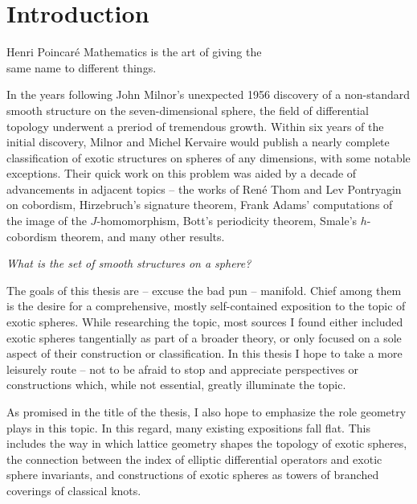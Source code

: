 \chapter{Introduction}\label{chap:introduction}

\begin{epigraph}{16em}{Henri Poincar\'e}
Mathematics is the art of giving the \\
same name to different things.
\end{epigraph}

In the years following John Milnor's unexpected 1956 discovery of a non-standard smooth structure on the seven-dimensional sphere, the field of differential topology underwent a preriod of tremendous growth. Within six years of the initial discovery, Milnor and Michel Kervaire would publish a nearly complete classification of exotic structures on spheres of any dimensions, with some notable exceptions. 
Their quick work on this problem was aided by a decade of advancements in adjacent topics -- the works of Ren\'e Thom and Lev Pontryagin on cobordism, Hirzebruch's signature theorem, Frank Adams' computations of the image of the $J$-homomorphism, Bott's periodicity theorem, Smale's $h$-cobordism theorem, and many other results. 


\begin{center}
  \textsl{What is the set of smooth structures on a sphere?}
\end{center}

The goals of this thesis are -- excuse the bad pun -- manifold. Chief among them is the desire for a comprehensive, mostly self-contained exposition to the topic of exotic spheres. While researching the topic, most sources I found either included exotic spheres tangentially as part of a broader theory, or only focused on a sole aspect of their construction or classification.
In this thesis I hope to take a more leisurely route -- not to be afraid to stop and appreciate perspectives or constructions which, while not essential, greatly illuminate the topic.

As promised in the title of the thesis, I also hope to emphasize the role geometry plays in this topic. In this regard, many existing expositions fall flat. 
This includes the way in which lattice geometry shapes the topology of exotic spheres, the connection between the index of elliptic differential operators and exotic sphere invariants, and constructions of exotic spheres as towers of branched coverings of classical knots. 

